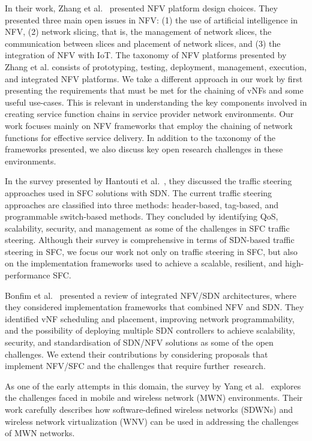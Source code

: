 \documentclass[futureinternet,review,accept,pdftex,moreauthors]{Definitions/mdpi}
\begin{document}
In their work, Zhang {et al.}~\cite{zhang2020nfv} presented NFV platform design choices. They presented three main open issues in NFV: (1) the use of artificial intelligence in NFV, (2) network slicing, that is, the management of network slices, the communication between slices and placement of network slices, and (3) the integration of NFV with IoT. The taxonomy of NFV platforms presented by Zhang {et al.} consists of prototyping, testing, deployment, management, execution, and integrated NFV platforms. We take a different approach in our work by first presenting the requirements that must be met for the chaining of vNFs and some useful use-cases. This is relevant in understanding the key components involved in creating service function chains in service provider network environments. Our work focuses mainly on NFV frameworks that employ the chaining of network functions for effective service delivery. In addition to the taxonomy of the frameworks presented, we also discuss key open research challenges in these environments.

In the survey presented by Hantouti {et al.}~\cite{hantouti2018traffic}, they discussed the traffic steering approaches used in SFC solutions with SDN. The current traffic steering approaches are classified into three methods: header-based, tag-based, and programmable switch-based methods. They concluded by identifying QoS, scalability, security, and management as some of the challenges in SFC traffic steering. Although their survey is comprehensive in terms of SDN-based traffic steering in SFC, we focus our work not only on traffic steering in SFC, but also on the implementation frameworks used to achieve a scalable, resilient, and high-performance SFC.

Bonfim {et al.}~\cite{bonfim2019integrated} presented a review of integrated NFV/SDN architectures, where they considered implementation frameworks that combined NFV and SDN. They identified vNF scheduling and placement, improving network programmability, and the possibility of deploying multiple SDN controllers to achieve scalability, security, and standardisation of SDN/NFV solutions as some of the open challenges. We extend their contributions by considering proposals that implement NFV/SFC and the challenges that require \mbox{further~research.}

As one of the early attempts in this domain, the survey by Yang {et al.}~\cite{yang2015software} explores the challenges faced in mobile and wireless network (MWN) environments. Their work carefully describes how software-defined wireless networks (SDWNs) and wireless network virtualization (WNV) can be used in addressing the challenges of MWN networks.
\end{document}
